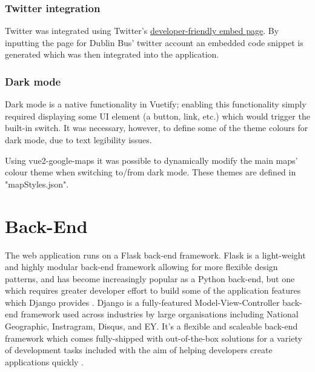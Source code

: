 \documentclass[]{UCD_CS_47360_Report}
\begin{document}
\subsubsection{Twitter integration}
Twitter was integrated using Twitter's \href{https://developer.twitter.com/en/docs/twitter-for-websites/embedded-tweets/overview}{developer-friendly embed page}. By inputting the page for Dublin Bus' twitter account an embedded code snippet is generated which was then integrated into the application.

\subsubsection{Dark mode}
Dark mode is a native functionality in Vuetify; enabling this functionality simply required displaying some UI element (a button, link, etc.) which would trigger the built-in switch. It was necessary, however, to define some of the theme colours for dark mode, due to text legibility issues.

Using vue2-google-maps it was possible to dynamically modify the main maps' colour theme when switching to/from dark mode. These themes are defined in "mapStyles.json". %


\newpage

\section{Back-End}
The web application runs on a Flask back-end framework. Flask is a light-weight and highly modular back-end framework allowing for more flexible design patterns, and has become increasingly popular as a Python back-end, but one which requires greater developer effort to build some of the application features which Django provides \cite{WhyFlask}. Django is a fully-featured Model-View-Controller back-end framework used across industries by large organisations including National Geographic, Instragram, Disqus, and EY. It's a flexible and scaleable back-end framework which comes fully-shipped with out-of-the-box solutions for a variety of development tasks included with the aim of helping developers create applications quickly \cite{WhyDjango}.
\end{document}
